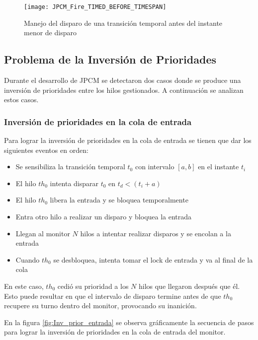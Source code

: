 \begin{figure}[H]
  \centering
  \texttt{[image: JPCM\_Fire\_TIMED\_BEFORE\_TIMESPAN]}
  \caption{Manejo del disparo de una transición temporal antes del instante
  menor de disparo}
  \label{fig:JPCM_Fire_TIMED_BEFORE_TIMESPAN}
\end{figure}

\subsection{Problema de la Inversión de Prioridades}
\label{sec:inversion_prioridad}
Durante el desarrollo de JPCM se detectaron dos casos donde se produce una
inversión de prioridades entre los hilos gestionados. A continuación se
analizan estos casos.

\subsubsection{Inversión de prioridades en la cola de entrada}
\label{inversion_prioridad_cola_entrada}
Para lograr la inversión de prioridades en la cola de entrada se tienen que dar
los siguientes eventos en orden:
\begin{itemize}
  \item Se sensibiliza la transición temporal $t_{0}$ con intervalo $[a,b]$ en
  el instante $t_{i}$
  \item El hilo $th_{0}$ intenta disparar $t_{0}$ en $t_{d} < (t_{i} + a)$
  \item El hilo $th_{0}$ libera la entrada y se bloquea temporalmente
  \item Entra otro hilo a realizar un disparo y bloquea la entrada
  \item Llegan al monitor $N$ hilos a intentar realizar disparos y se encolan a
  la entrada
  \item Cuando $th_{0}$ se desbloquea, intenta tomar el lock de entrada y va al
  final de la cola
\end{itemize}

En este caso, $th_{0}$ cedió su prioridad a los $N$ hilos que llegaron después
que él. Esto puede resultar en que el intervalo de disparo termine antes de que
$th_{0}$ recupere su turno dentro del monitor, provocando su inanición.

En la figura \ref{fig:Inv_prior_entrada} se observa gráficamente la secuencia de
pasos para lograr la inversión de prioridades en la cola de entrada del monitor.

